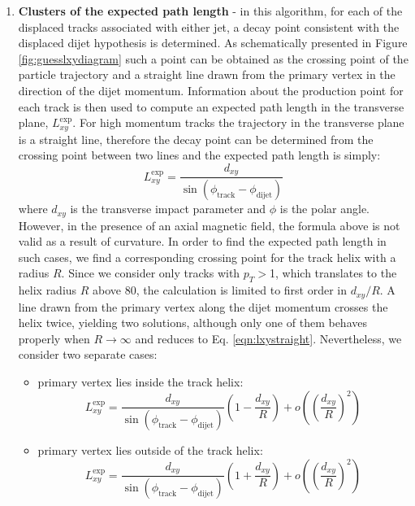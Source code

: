 \begin{enumerate}
\item{\bf Clusters of the expected path length}  
\label{subsec:Clusters}
- in this algorithm, for each of the displaced tracks associated with either jet, a decay point consistent 
with the displaced dijet hypothesis 
is determined. As schematically presented in Figure 
\ref{fig:guesslxydiagram} such a point 
 can be obtained as the crossing point of   
the particle trajectory and a straight line drawn from the primary vertex in the direction of the dijet momentum.  
Information about the production point for each track is then used to compute an expected path length in the
transverse plane, $L_{xy}^\text{exp}$.  
For high momentum tracks the trajectory in the transverse plane is a straight line,
 therefore the decay point can be determined from the crossing point between two lines
 and the expected path length is simply:
\begin{equation}
 L_{xy}^\text{exp}=\frac{d_{xy}}{\sin(\phi_\text{track} - \phi_\text{dijet})}
\label{eqn:lxystraight}
\end{equation}
where $d_{xy}$ is the transverse impact parameter and $\phi$ is the polar angle. However, 
in the presence of an axial magnetic field, the formula above is not valid as a result of
curvature. In order to find the expected path length in such cases,
 we find a corresponding crossing point for the track helix with a radius $R$. Since we consider only
tracks with $p_T>$1\GeV, which translates to the helix radius $R$ above 80\cm, 
the calculation is limited to first order in 
$d_{xy}/R$. 
 A line drawn from the primary vertex along the dijet momentum crosses the helix twice, yielding
 two solutions, although only one of them behaves properly when $R \to \infty$ 
and reduces to Eq. \ref{eqn:lxystraight}. Nevertheless, we consider two  
separate cases:
\begin{itemize}
 \item primary vertex lies inside the track helix:
\begin{equation}
 L_{xy}^\text{exp} = \frac{d_{xy}}{\sin\left(\phi_\text{track} - \phi_\text{dijet}\right)} \left(1 - \frac{d_{xy}}{R}\right) + o\left(\left(\frac{d_{xy}}{R}\right)^2\right)
\end{equation} 
 \item primary vertex lies outside of the track helix:
\begin{equation}
 L_{xy}^\text{exp} = \frac{d_{xy}}{\sin\left(\phi_\text{track} - \phi_\text{dijet}\right)} \left(1 + \frac{d_{xy}}{R}\right) + o\left(\left(\frac{d_{xy}}{R}\right)^2\right)

\end{equation}
\end{itemize}
\end{enumerate}
